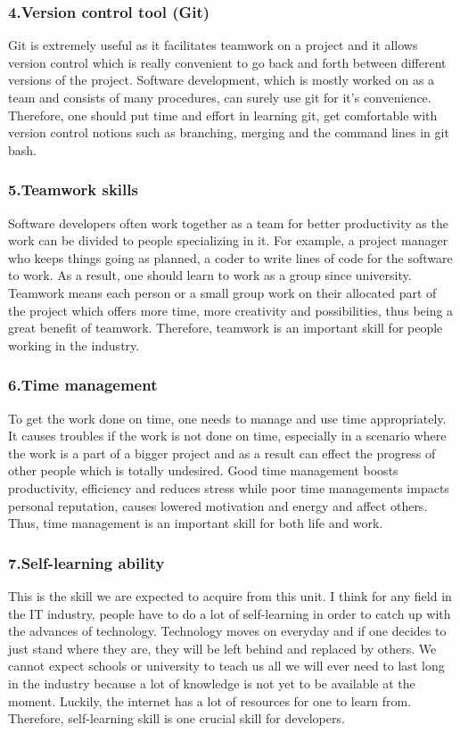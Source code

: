 \documentclass[a4paper, 11pt]{report}
\begin{document}
	\subsubsection{4.Version control tool (Git)} 
	Git is extremely useful as it facilitates teamwork on a project and it allows version control which is really convenient to go back and forth between different versions of the project. Software development, which is mostly worked on as a team and consists of many procedures, can surely use git for it’s convenience. Therefore, one should put time and effort in learning git, get comfortable with version control notions such as branching, merging and the command lines in git bash.
	\subsubsection{5.Teamwork skills}
	 Software developers often work together as a team for better productivity as the work can be divided to people specializing in it. For example, a project manager who keeps things going as planned, a coder to write lines of code for the software to work.
As a result, one should learn to work as a group since university. Teamwork means each person or a small group work on their allocated part of the project which offers more time, more creativity and possibilities, thus being a great benefit of teamwork. Therefore, teamwork is an important skill for people working in the industry.
	\subsubsection{6.Time management}
	 To get the work done on time, one needs to manage and use time appropriately. It causes troubles if the work is not done on time, especially in a scenario where the work is a part of a bigger project and as a result can effect the progress of other people which is totally undesired. Good time management boosts productivity, efficiency and reduces stress while poor time managements impacts personal reputation, causes lowered motivation and energy and affect others. Thus, time management is an important skill for both life and work.
	\subsubsection{7.Self-learning ability}
	 This is the skill we are expected to acquire from this unit. I think for any field in the IT industry, people have to do a lot of self-learning in order to catch up with the advances of technology. Technology moves on everyday and if one decides to just stand where they are, they will be left behind and replaced by others. We cannot expect schools or university to teach us all we will ever need to last long in the industry  because a lot of knowledge is not yet to be available at the moment. Luckily, the internet has a lot of resources for one to learn from. Therefore, self-learning skill is one crucial skill for developers.
\end{document}
